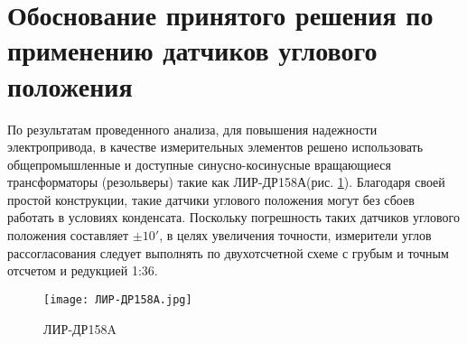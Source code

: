 \section{Обоснование принятого решения по применению датчиков углового положения}
По результатам проведенного анализа, для повышения надежности электропривода, в качестве измерительных элементов решено использовать общепромышленные и доступные 
синусно-косинусные вращающиеся трансформаторы (резольверы) такие как ЛИР-ДР158А(рис. \ref{LIR}). Благодаря своей простой конструкции, 
такие датчики углового положения могут без сбоев работать в условиях конденсата. Поскольку погрешность таких датчиков углового положения составляет $ \pm 10'$, 
в целях увеличения точности, измерители углов рассогласования следует выполнять по двухотсчетной схеме с грубым и точным отсчетом и редукцией 1:36. 

  \begin{figure}[!h]
    \centering
    \texttt{[image: ЛИР-ДР158A.jpg]}
    \caption{ЛИР-ДР158A}
    \label{LIR}
  \end{figure}

   \FloatBarrier

  